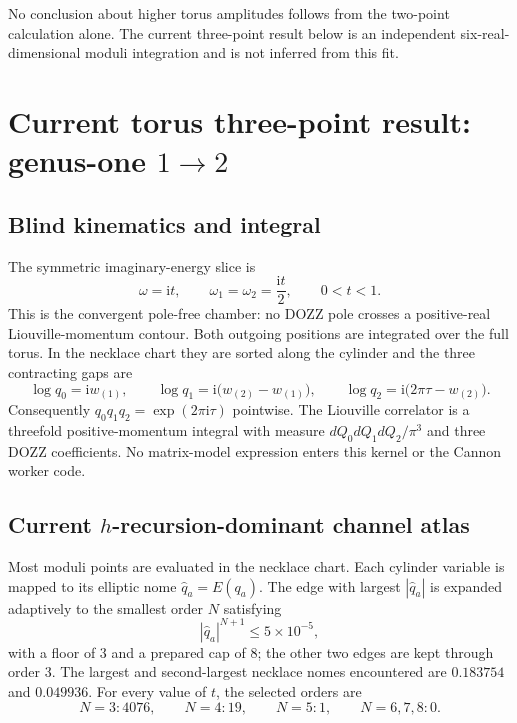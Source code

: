 \documentclass[11pt]{article}
\newcommand{\ii}{\mathrm{i}}
\begin{document}
No conclusion about higher torus amplitudes follows from the two-point
calculation alone.  The current three-point result below is an independent
six-real-dimensional moduli integration and is not inferred from this fit.

\section{Current torus three-point result: genus-one
\texorpdfstring{$1\to2$}{1 to 2}}
\label{sec:three-point}

\subsection{Blind kinematics and integral}

The symmetric imaginary-energy slice is
\begin{equation}
 \omega=\ii t,
 \qquad
 \omega_1=\omega_2=\frac{\ii t}{2},
 \qquad 0<t<1.
 \label{eq:three-point-kinematics}
\end{equation}
This is the convergent pole-free chamber: no DOZZ pole crosses a positive-real
Liouville-momentum contour.  Both outgoing positions are integrated over the
full torus.  In the necklace chart they are sorted along the cylinder and the
three contracting gaps are
\begin{equation}
 \log q_0=\ii w_{(1)},
 \qquad
 \log q_1=\ii\bigl(w_{(2)}-w_{(1)}\bigr),
 \qquad
 \log q_2=\ii\bigl(2\pi\tau-w_{(2)}\bigr).
 \label{eq:three-point-gaps}
\end{equation}
Consequently $q_0q_1q_2=\exp(2\pi\ii\tau)$ pointwise.  The Liouville
correlator is a threefold positive-momentum integral with measure
$dQ_0dQ_1dQ_2/\pi^3$ and three DOZZ coefficients.  No matrix-model expression
enters this kernel or the Cannon worker code.

\subsection{Current \texorpdfstring{$h$}{h}-recursion-dominant channel atlas}

Most moduli points are evaluated in the necklace chart.  Each cylinder
variable is mapped to its elliptic nome $\widehat q_a=E(q_a)$.  The edge with
largest $|\widehat q_a|$ is expanded adaptively to the smallest order $N$
satisfying
\begin{equation}
 |\widehat q_a|^{N+1}\leq5\times10^{-5},
 \label{eq:three-point-order-rule}
\end{equation}
with a floor of 3 and a prepared cap of 8; the other two edges are kept
through order 3.  The largest and second-largest necklace nomes encountered
are $0.183754$ and $0.049936$.  For every value of $t$, the selected orders are
\begin{equation}
 N=3:4076,
 \qquad N=4:19,
 \qquad N=5:1,
 \qquad N=6,7,8:0.
\end{equation}
\end{document}
